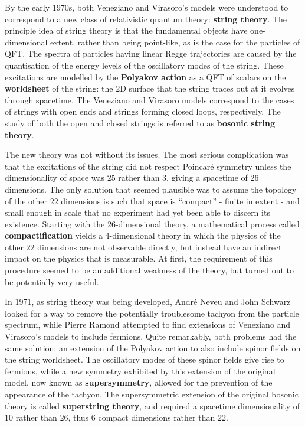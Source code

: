\documentclass[12pt]{article}
\begin{document}
By the early 1970s, both Veneziano and Virasoro's models were understood to correspond to a new class of relativistic quantum theory: \textbf{string theory}. The principle idea of string theory is that the fundamental objects have one-dimensional extent, rather than being point-like, as is the case for the particles of QFT. The spectra of particles having linear Regge trajectories are caused by the quantisation of the energy levels of the oscillatory modes of the string. These excitations are modelled by the \textbf{Polyakov action} as a QFT of scalars on the \textbf{worldsheet} of the string: the $2$D surface that the string traces out at it evolves through spacetime. The Veneziano and Virasoro models correspond to the cases of strings with open ends and strings forming closed loops, respectively. The study of both the open and closed strings is referred to as \textbf{bosonic string theory}.
\newline

The new theory was not without its issues. The most serious complication was that the excitations of the string did not respect Poincaré symmetry unless the dimensionality of space was $25$ rather than $3$, giving a spacetime of $26$ dimensions. The only solution that seemed plausible was to assume the topology of the other $22$ dimensions is such that space is ``compact'' - finite in extent - and small enough in scale that no experiment had yet been able to discern its existence. Starting with the $26$-dimensional theory, a mathematical process called \textbf{compactification} yields a $4$-dimensional theory in which the physics of the other $22$ dimensions are not observable directly, but instead have an indirect impact on the physics that is measurable. At first, the requirement of this procedure seemed to be an additional weakness of the theory, but turned out to be potentially very useful.
\newline

In 1971, as string theory was being developed, André Neveu and John Schwarz looked for a way to remove the potentially troublesome tachyon from the particle spectrum, while Pierre Ramond attempted to find extensions of Veneziano and Virasoro's models to include fermions. Quite remarkably, both problems had the same solution: an extension of the Polyakov action to also include spinor fields on the string worldsheet. The oscillatory modes of these spinor fields give rise to fermions, while a new symmetry exhibited by this extension of the original model, now known as \textbf{supersymmetry}, allowed for the prevention of the appearance of the tachyon. The supersymmetric extension of the original bosonic theory is called \textbf{superstring theory}, and required a spacetime dimensionality of $10$ rather than $26$, thus $6$ compact dimensions rather than $22$.
\newline
\end{document}
